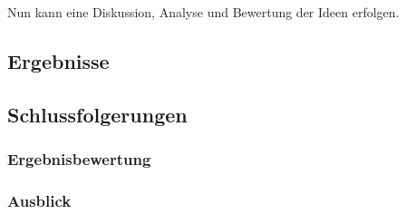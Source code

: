 Nun kann eine Diskussion, Analyse und Bewertung der Ideen erfolgen.

\newpage



\newpage


\newpage


\newpage


\newpage


\subsection{Ergebnisse}

\subsection{Schlussfolgerungen}
\subsubsection{Ergebnisbewertung}
\subsubsection{Ausblick}